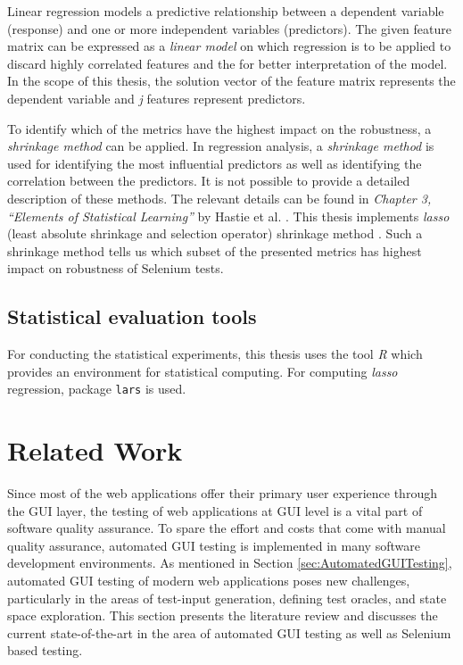 Linear regression models a predictive relationship between a dependent variable (response) and one or more independent variables (predictors). The given feature matrix can be expressed as a \textit{linear model} on which regression is to be applied to discard highly correlated features and the for better interpretation of the model. In the scope of this thesis, the solution vector of the feature matrix represents the dependent variable and \textit{j} features represent predictors. 

To identify which of the metrics have the highest impact on the robustness, a \textit{shrinkage method} can be applied. In regression analysis, a \textit{shrinkage method} is used for identifying the most influential predictors as well as identifying the correlation between the predictors. It is not possible to provide a detailed description of these methods. The relevant details can be found in \textit{Chapter 3, ``Elements of Statistical Learning''} by Hastie et al. \cite{hastie01statisticallearning}. This thesis implements \textit{lasso} (least absolute shrinkage and selection operator) shrinkage method \cite{tibshirani1996regression}. Such a shrinkage method tells us which subset of the presented metrics has highest impact on robustness of Selenium tests.

\subsection*{Statistical evaluation tools}
For conducting the statistical experiments, this thesis uses the tool \textit{R} \cite{Rtool} which provides an environment for statistical computing. For computing \textit{lasso} regression, package \texttt{lars} \cite{larspack} is used. 
\section{Related Work}
\label{sec:relatedWork}

Since most of the web applications offer their primary user experience through the GUI layer, the testing of web applications at GUI level is a vital part of software quality assurance. To spare the effort and costs that come with manual quality assurance, automated GUI testing is implemented in many software development environments. As mentioned in Section \ref{sec:AutomatedGUITesting}, automated GUI testing of modern web applications poses new challenges, particularly in the areas of test-input generation, defining test oracles, and state space exploration. This section presents the literature review and discusses the current state-of-the-art in the area of automated GUI testing as well as Selenium\cite{websiteSelenium} based testing. 


